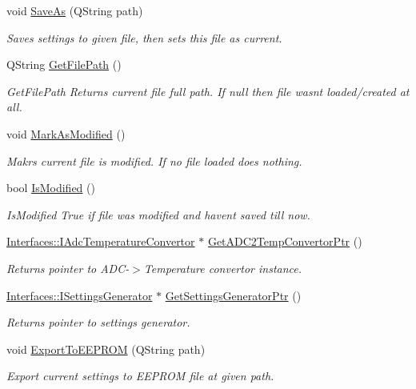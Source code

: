 \begin{DoxyCompactItemize}
void \hyperlink{class_settings_saver_loader_a67b93496f8b0a0a779d783e967d93572}{Save\+As} (Q\+String path)
\begin{DoxyCompactList}\small\item\em Saves settings to given file, then sets this file as current. \end{DoxyCompactList}\item 
Q\+String \hyperlink{class_settings_saver_loader_a006a6350a00ffc18ec544616e504ccf7}{Get\+File\+Path} ()
\begin{DoxyCompactList}\small\item\em Get\+File\+Path Returns current file full path. If null then file wasn\textquotesingle{}t loaded/created at all. \end{DoxyCompactList}\item 
\mbox{\label{class_settings_saver_loader_afc1ec1b13b273216779f3c9a9137cf87}} 
void \hyperlink{class_settings_saver_loader_afc1ec1b13b273216779f3c9a9137cf87}{Mark\+As\+Modified} ()
\begin{DoxyCompactList}\small\item\em Makrs current file is modified. If no file loaded does nothing. \end{DoxyCompactList}\item 
bool \hyperlink{class_settings_saver_loader_a35574bdfc340a148245ea8017c59f2eb}{Is\+Modified} ()
\begin{DoxyCompactList}\small\item\em Is\+Modified True if file was modified and haven\textquotesingle{}t saved till now. \end{DoxyCompactList}\item 
\hyperlink{class_interfaces_1_1_i_adc_temperature_convertor}{Interfaces\+::\+I\+Adc\+Temperature\+Convertor} $\ast$ \hyperlink{class_settings_saver_loader_aa1265b1e9431bf3b611e5b45b4782700}{Get\+A\+D\+C2\+Temp\+Convertor\+Ptr} ()
\begin{DoxyCompactList}\small\item\em Returns pointer to A\+D\+C-\/$>$Temperature convertor instance. \end{DoxyCompactList}\item 
\hyperlink{class_interfaces_1_1_i_settings_generator}{Interfaces\+::\+I\+Settings\+Generator} $\ast$ \hyperlink{class_settings_saver_loader_aa6b0a9b4f42335b03341a13f8bfff845}{Get\+Settings\+Generator\+Ptr} ()
\begin{DoxyCompactList}\small\item\em Returns pointer to settings generator. \end{DoxyCompactList}\item 
void \hyperlink{class_settings_saver_loader_a2a3e3c7f6f1f521b9423db4d63ddae74}{Export\+To\+E\+E\+P\+R\+OM} (Q\+String path)
\begin{DoxyCompactList}\small\item\em Export current settings to E\+E\+P\+R\+OM file at given path. \end{DoxyCompactList}\end{DoxyCompactItemize}
